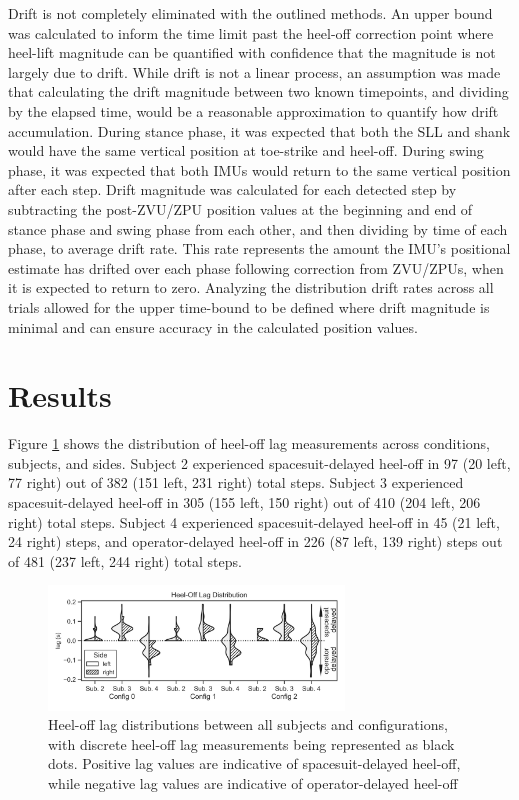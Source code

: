 \documentclass[defaultstyle,11pt]{thesis}
\begin{document}
Drift is not completely eliminated with the outlined methods.
An upper bound was calculated to inform the time limit past the heel-off correction point where heel-lift magnitude can be quantified with confidence that the magnitude is not largely due to drift.
While drift is not a linear process, an assumption was made that calculating the drift magnitude between two known timepoints, and dividing by the elapsed time, would be a reasonable approximation to quantify how drift accumulation.
During stance phase, it was expected that both the SLL and shank would have the same vertical position at toe-strike and heel-off.
During swing phase, it was expected that both IMUs would return to the same vertical position after each step.
Drift magnitude was calculated for each detected step by subtracting the post-ZVU/ZPU position values at the beginning and end of stance phase and swing phase from each other, and then dividing by time of each phase, to average drift rate.
This rate represents the amount the IMU's positional estimate has drifted over each phase following correction from ZVU/ZPUs, when it is expected to return to zero.
Analyzing the distribution drift rates across all trials allowed for the upper time-bound to be defined where drift magnitude is minimal and can ensure accuracy in the calculated position values.

\hypertarget{results}{%
\section{Results}\label{results}}

Figure \ref{fig:SA1-Lag} shows the distribution of heel-off lag measurements across conditions, subjects, and sides.
Subject 2 experienced spacesuit-delayed heel-off in 97 (20 left, 77 right) out of 382 (151 left, 231 right) total steps.
Subject 3 experienced spacesuit-delayed heel-off in 305 (155 left, 150 right) out of 410 (204 left, 206 right) total steps.
Subject 4 experienced spacesuit-delayed heel-off in 45 (21 left, 24 right) steps, and operator-delayed heel-off in 226 (87 left, 139 right) steps out of 481 (237 left, 244 right) total steps.

\begin{figure}
\hypertarget{fig:SA1-Lag}{%
\centering
\includegraphics[width=0.7\textwidth,height=\textheight]{../fig/SA1/heelOffLag.png}
\caption{Heel-off lag distributions between all subjects and configurations, with discrete heel-off lag measurements being represented as black dots. Positive lag values are indicative of spacesuit-delayed heel-off, while negative lag values are indicative of operator-delayed heel-off}\label{fig:SA1-Lag}
}
\end{figure}
\end{document}
